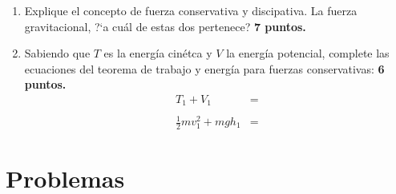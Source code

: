 \documentclass[]{article}
\begin{document}
\begin{enumerate}
\begin{multicols}{4}
\begin{align*}
\boldsymbol{A_{x}} &= A\cos(\theta) \\
\boldsymbol{A_{x}} &= \boldsymbol{A_{y}} 
\end{align*}
\end{multicols}

\item Explique el concepto de fuerza conservativa y discipativa. La fuerza
gravitacional, ?`a cuál de estas dos pertenece?
\hfill \textbf{7 puntos.}

\item Sabiendo que $T$ es la energ\'ia cin\'etca y $V$ la energ\'ia potencial,
complete las ecuaciones del teorema de trabajo y energ\'ia para fuerzas
conservativas:
\hfill \textbf{6 puntos.}
\begin{align*}
T_{1} + V_{1} &=  \\ \nonumber \\
\frac{1}{2}mv^{2}_{1} + mgh_{1} &= 
\end{align*}


\end{enumerate}


\section*{Problemas} %
\label{sec:problemas}
\end{document}
